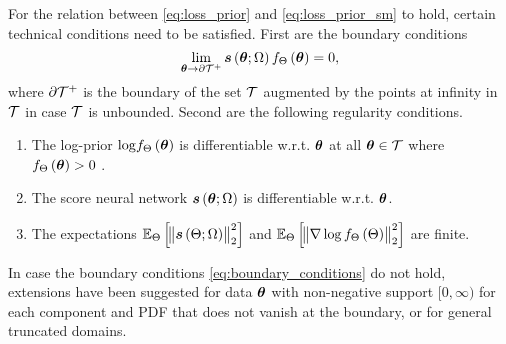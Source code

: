 {For the relation between \eqref{eq:loss_prior} and \eqref{eq:loss_prior_sm} to hold, certain technical conditions need to be satisfied.
First are the} boundary conditions
\begin{equation}\label{eq:boundary_conditions}
    \lim\limits_{\bm{\theta}\rightarrow \partial\mathcal{T}^{+}}\bm{s}\left(\bm{\theta};\Omega\right)f_{\Theta}\left(\bm{\theta}\right)=0, 
\end{equation}
where $\partial\mathcal{T}^{+}$ is the boundary of the set $\mathcal{T}$ augmented by the points at infinity in $\mathcal{T}$ in case $\mathcal{T}$ is unbounded. 
{%
Second are the following} regularity conditions\cite{hyvarinen2005estimation}. 
\begin{assumption}\label{ass:score_reg_prior} 
\hspace*{2cm}
\begin{enumerate}[label={\ref*{ass:score_reg_prior}}.\arabic*,labelsep=*, leftmargin=*]

\item The {log-{prior}} ${\log}f_{\Theta}\left(\bm{\theta}\right)$ is differentiable w.r.t. $\bm{\theta}$ {at all $\bm{\theta}\in\mathcal{T}$ where $f_{\Theta}\left(\bm{\theta}\right)>0$} \label{assum:diff_prob_prior}. 
    
\item The score neural network $\bm{s}\left(\bm{\theta} ;\Omega\right)$ is differentiable w.r.t. $\bm{\theta}$. 
\item The expectations $\mathbb{E}_{\Theta}\left[\norm{\bm{s}\left(\Theta;\Omega\right)}_2^2\right]$ and $\mathbb{E}_{\Theta}\left[\norm{\nabla\log f_{\Theta}\left(\Theta\right)}_2^2\right]$ are finite. \label{assume:expecte_fine_score_matching}
\end{enumerate}
\end{assumption}
In case the boundary conditions \eqref{eq:boundary_conditions} do not hold, %
extensions have been suggested \cite{hyvarinen2007some} for  data  
 $\bm{\theta}$ with non-negative support %
 {$[0,\infty)$ for each component} and %
 {PDF that does not vanish at the boundary,}  or for general truncated domains\cite{liu2022estimating}.